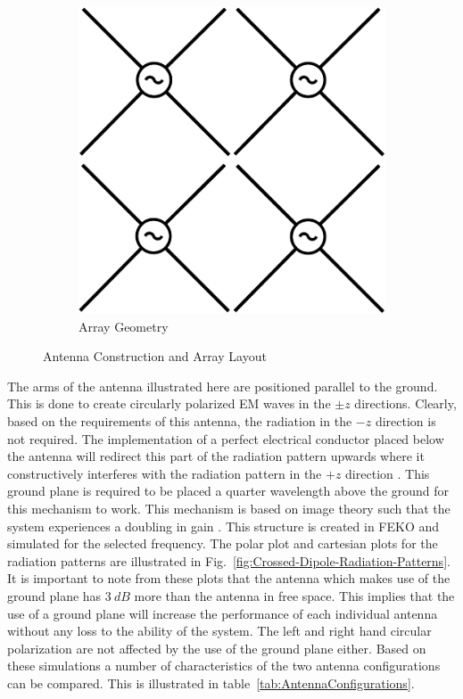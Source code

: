 \documentclass[11pt]{witseiepaper}
\begin{document}
\begin{bibunit}[witseie]
\begin{figure}[htb]
\begin{subfigure}{.3\textwidth}
        \end{subfigure}%
        \begin{subfigure}{.3\textwidth}
            \centering
            \includegraphics[width=\textwidth]{ArrayGeometry.pdf}
            \caption{Array Geometry}
            \label{fig:ArrayGeometry}  
            \end{subfigure}
\caption{Antenna Construction and Array Layout}
\label{fig:AntennaConstructionArrayLayout}
\end{figure}
The arms of the antenna illustrated here are positioned parallel to the ground. This is done to create circularly polarized EM waves in the $\pm z$ directions.
Clearly, based on the requirements of this antenna, the radiation in the $-z$ direction is not required. The implementation of a perfect electrical conductor placed below the antenna will redirect this part of the radiation pattern upwards where it constructively interferes with the radiation pattern in the $+z$ direction \cite[p.~110-111]{IEEECrossedDipole}. This ground plane is required to be placed a quarter wavelength above the ground for this mechanism to work. This mechanism is based on image theory such that the system experiences a doubling in gain \cite[p.~111]{IEEECrossedDipole}. This structure is created in FEKO \cite{FEKO} and simulated for the selected frequency. The polar plot and cartesian plots for the radiation patterns are illustrated in Fig.~\ref{fig:Crossed-Dipole-Radiation-Patterns}. It is important to note from these plots that the antenna which makes use of the ground plane has $3~dB$ more than the antenna in free space. This implies that the use of a ground plane will increase the performance of each individual antenna without any loss to the ability of the system. The left and right hand circular polarization are not affected by the use of the ground plane either. Based on these simulations a number of characteristics of the two antenna configurations can be compared. This is illustrated in table~\ref{tab:AntennaConfigurations}.

\end{bibunit}
\end{document}
